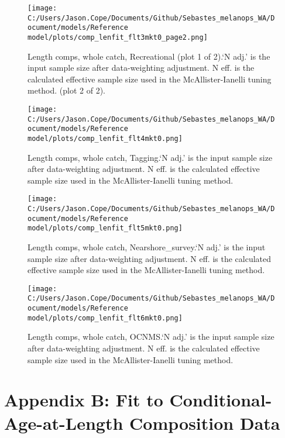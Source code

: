 \documentclass[11pt,
  english,
  letterpaper,
]{article}
\begin{document}
\begin{figure}
\centering
\texttt{[image: C:/Users/Jason.Cope/Documents/Github/Sebastes\_melanops\_WA/Document/models/Reference model/plots/comp\_lenfit\_flt3mkt0\_page2.png]}
\caption{Length comps, whole catch, Recreational (plot 1 of 2).`N adj.' is the input sample size after data-weighting adjustment. N eff. is the calculated effective sample size used in the McAllister-Ianelli tuning method. (plot 2 of 2).\label{fig:comp_lenfit_flt3mkt0_page2}}
\end{figure}

\begin{figure}
\centering
\texttt{[image: C:/Users/Jason.Cope/Documents/Github/Sebastes\_melanops\_WA/Document/models/Reference model/plots/comp\_lenfit\_flt4mkt0.png]}
\caption{Length comps, whole catch, Tagging.`N adj.' is the input sample size after data-weighting adjustment. N eff. is the calculated effective sample size used in the McAllister-Ianelli tuning method.\label{fig:comp_lenfit_flt4mkt0}}
\end{figure}

\begin{figure}
\centering
\texttt{[image: C:/Users/Jason.Cope/Documents/Github/Sebastes\_melanops\_WA/Document/models/Reference model/plots/comp\_lenfit\_flt5mkt0.png]}
\caption{Length comps, whole catch, Nearshore\_survey.`N adj.' is the input sample size after data-weighting adjustment. N eff. is the calculated effective sample size used in the McAllister-Ianelli tuning method.\label{fig:comp_lenfit_flt5mkt0}}
\end{figure}

\begin{figure}
\centering
\texttt{[image: C:/Users/Jason.Cope/Documents/Github/Sebastes\_melanops\_WA/Document/models/Reference model/plots/comp\_lenfit\_flt6mkt0.png]}
\caption{Length comps, whole catch, OCNMS.`N adj.' is the input sample size after data-weighting adjustment. N eff. is the calculated effective sample size used in the McAllister-Ianelli tuning method.\label{fig:comp_lenfit_flt6mkt0}}
\end{figure}

\clearpage

\hypertarget{app-b}{%
\section{Appendix B: Fit to Conditional-Age-at-Length Composition Data}\label{app-b}}
\end{document}
